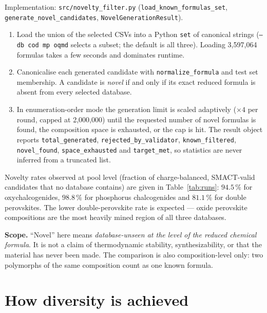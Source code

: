 \documentclass[11pt,a4paper]{article}
\newcommand{\pkg}[1]{\texttt{#1}}
\newcommand{\code}[1]{\texttt{#1}}
\newcommand{\cmd}[1]{\texttt{\small #1}}
\begin{document}
Implementation: \pkg{src/novelty\_filter.py} (\code{load\_known\_\allowbreak formulas\_set},
\code{generate\_novel\_\allowbreak candidates}, \code{NovelGenerationResult}).

\begin{enumerate}[label=\arabic*.]
  \item Load the union of the selected CSVs into a Python \code{set} of canonical strings
        (\cmd{--db cod mp oqmd} selects a subset; the default is all three). Loading 3{,}597{,}064
        formulas takes a few seconds and dominates runtime.
  \item Canonicalise each generated candidate with \code{normalize\_formula} and test set
        membership. A candidate is \emph{novel} if and only if its exact reduced formula is absent
        from every selected database.
  \item In enumeration-order mode the generation limit is scaled adaptively ($\times 4$ per round,
        capped at 2{,}000{,}000) until the requested number of novel formulas is found, the
        composition space is exhausted, or the cap is hit. The result object reports
        \code{total\_generated}, \code{rejected\_by\_validator}, \code{known\_filtered},
        \code{novel\_found}, \code{space\_exhausted} and \code{target\_met}, so statistics are
        never inferred from a truncated list.
\end{enumerate}

Novelty rates observed at pool level (fraction of charge-balanced, SMACT-valid candidates that no
database contains) are given in Table~\ref{tab:runs}: $94.5\,\%$ for oxychalcogenides, $98.8\,\%$
for phosphorus chalcogenides and $81.1\,\%$ for double perovskites. The lower double-perovskite
rate is expected --- oxide perovskite compositions are the most heavily mined region of all three
databases.

\textbf{Scope.} ``Novel'' here means \emph{database-unseen at the level of the reduced chemical
formula}. It is not a claim of thermodynamic stability, synthesizability, or that the material has
never been made. The comparison is also composition-level only: two polymorphs of the same
composition count as one known formula.

\section{How diversity is achieved}
\end{document}
